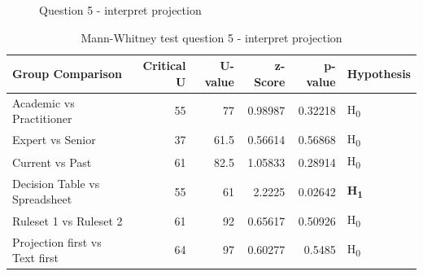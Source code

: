 \begin{figure}[H]
    \centering
    \caption{Question 5 - interpret projection}
    \label{fig:stackedbar_Q2}
\end{figure}

\begin{table}[H]
    \begin{center}
        \begin{tabular}{ |l ||r |r |r | r|l | } 
            \hline
            Group Comparison                 & Critical U & U-value & z-Score  & p-value & Hypothesis         \\
            \hline
            \hline
            Academic vs Practitioner         & 55        & 77      &  0.98987  & 0.32218 & H\textsubscript{0} \\ 
            \hline
            Expert vs Senior                 & 37        & 61.5    &  0.56614  & 0.56868 & H\textsubscript{0} \\ 
            \hline
            Current vs Past                  & 61        & 82.5    &  1.05833  & 0.28914 & H\textsubscript{0} \\ 
            \hline
            Decision Table vs Spreadsheet    & 55        & 61      &  2.2225   & 0.02642 & \textbf{H\textsubscript{1}}  \\ 
            \hline
            Ruleset 1 vs Ruleset 2           & 61        & 92      &  0.65617  & 0.50926 & H\textsubscript{0} \\ 
            \hline
            Projection first vs Text first   & 64        & 97      &  0.60277  & 0.5485  & H\textsubscript{0} \\ 
            \hline
        \end{tabular}
    \end{center}
    \caption{Mann-Whitney test question 5 - interpret projection}
    \label{table:mannwhitneyQ2}
\end{table}

